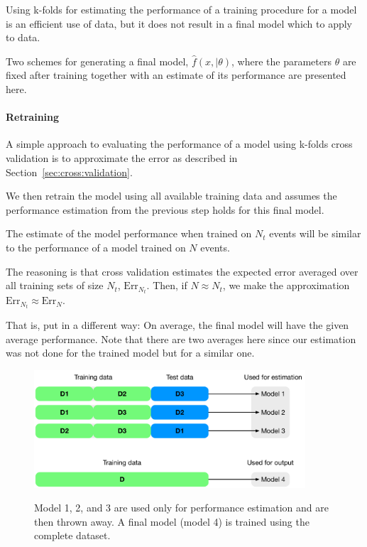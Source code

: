Using k-folds for estimating the performance of a training procedure for a model is an efficient use of data, but it does not result in a final model which to apply to data.

Two schemes for generating a final model, $\hat{f}(x, | \theta)$, where the parameters $\theta$ are fixed after training together with an estimate of its performance are presented here.

\paragraph{Retraining}
A simple approach to evaluating the performance of a model using k-folds cross validation is to approximate the error as described in Section~\ref{sec:cross:validation}.

We then retrain the model using all available training data and assumes the performance estimation from the previous step holds for this final model.

The estimate of the model performance when trained on $N_t$ events will be similar to the performance of a model trained on $N$ events.

The reasoning is that cross validation estimates the expected error averaged over all training sets of size $N_t$, $\text{Err}_{N_t}$. Then, if $N \approx N_t$, we make the approximation $\text{Err}_{N_t} \approx \text{Err}_{N}$.

That is, put in a different way: On average, the final model will have the given average performance. Note that there are two averages here since our estimation was not done for the trained model but for a similar one.

\begin{figure}
\begin{center}
   \includegraphics[width=0.9\textwidth]{plots/cv/cv-workflows-retrain}
   \label{fig:workflow0}
   \caption{Model 1, 2, and 3 are used only for performance estimation and are then thrown away. A final model (model 4) is trained using the complete dataset.}
\end{center}
\end{figure}

